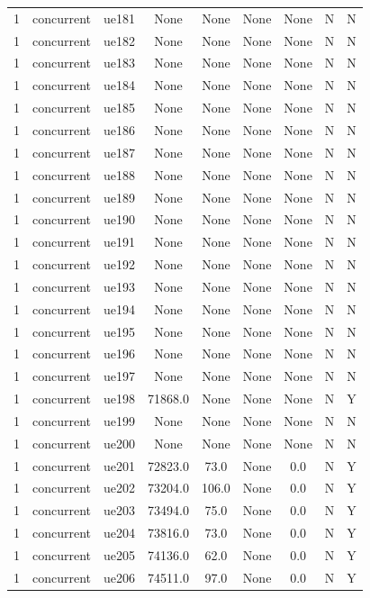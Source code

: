 \begin{table}[ht]
\begin{tabular}{|c|c|c|c|c|c|c|c|c|}
1 & concurrent & ue181 & None & None & None & None & N & N \\
1 & concurrent & ue182 & None & None & None & None & N & N \\
1 & concurrent & ue183 & None & None & None & None & N & N \\
1 & concurrent & ue184 & None & None & None & None & N & N \\
1 & concurrent & ue185 & None & None & None & None & N & N \\
1 & concurrent & ue186 & None & None & None & None & N & N \\
1 & concurrent & ue187 & None & None & None & None & N & N \\
1 & concurrent & ue188 & None & None & None & None & N & N \\
1 & concurrent & ue189 & None & None & None & None & N & N \\
1 & concurrent & ue190 & None & None & None & None & N & N \\
1 & concurrent & ue191 & None & None & None & None & N & N \\
1 & concurrent & ue192 & None & None & None & None & N & N \\
1 & concurrent & ue193 & None & None & None & None & N & N \\
1 & concurrent & ue194 & None & None & None & None & N & N \\
1 & concurrent & ue195 & None & None & None & None & N & N \\
1 & concurrent & ue196 & None & None & None & None & N & N \\
1 & concurrent & ue197 & None & None & None & None & N & N \\
1 & concurrent & ue198 & 71868.0 & None & None & None & N & Y \\
1 & concurrent & ue199 & None & None & None & None & N & N \\
1 & concurrent & ue200 & None & None & None & None & N & N \\
1 & concurrent & ue201 & 72823.0 & 73.0 & None & 0.0 & N & Y \\
1 & concurrent & ue202 & 73204.0 & 106.0 & None & 0.0 & N & Y \\
1 & concurrent & ue203 & 73494.0 & 75.0 & None & 0.0 & N & Y \\
1 & concurrent & ue204 & 73816.0 & 73.0 & None & 0.0 & N & Y \\
1 & concurrent & ue205 & 74136.0 & 62.0 & None & 0.0 & N & Y \\
1 & concurrent & ue206 & 74511.0 & 97.0 & None & 0.0 & N & Y \\

\end{tabular}
\end{table}
